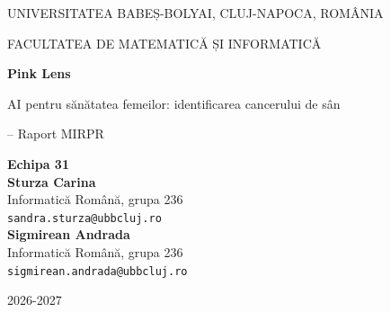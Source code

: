 \documentclass[runningheads,a4paper,11pt]{report}
\begin{document}
\begin{titlepage}
\sloppy

\begin{center}
UNIVERSITATEA BABEȘ-BOLYAI, CLUJ-NAPOCA, ROMÂNIA

FACULTATEA DE MATEMATICĂ ȘI INFORMATICĂ

\vspace{6cm}

\Huge \textbf{Pink Lens}

\vspace{0.5cm}

\Large AI pentru sănătatea femeilor: identificarea cancerului de sân

\vspace{1cm}

\normalsize -- Raport MIRPR

\end{center}


\vspace{4cm}

\begin{flushright}
{\Large \textbf{Echipa 31}}\\[0.8cm]
{\large \textbf{Sturza Carina}}\\
Informatică Română, grupa 236\\
\texttt{sandra.sturza@ubbcluj.ro}\\[0.5cm]
{\large \textbf{Sigmirean Andrada}}\\
Informatică Română, grupa 236\\
\texttt{sigmirean.andrada@ubbcluj.ro}
\end{flushright}

\vspace{1cm}

\begin{center}
2026-2027
\end{center}

\end{titlepage}

\end{document}
